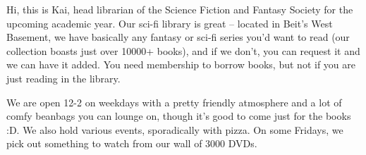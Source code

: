 Hi, this is Kai, head librarian of the Science Fiction and Fantasy Society for the upcoming academic year. Our sci-fi library is great -- located in Beit's West Basement, we have basically any fantasy or sci-fi series you'd want to read (our collection boasts just over 10000+ books), and if we don't, you can request it and we can have it added. You need membership to borrow books, but not if you are just reading in the library.

We are open 12-2 on weekdays with a pretty friendly atmosphere and a lot of comfy beanbags you can lounge on, though it's good to come just for the books :D. We also hold various events, sporadically with pizza. On some Fridays, we pick out something to watch from our wall of 3000 DVDs.